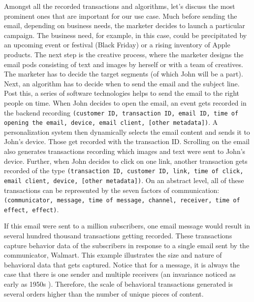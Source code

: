 Amongst all the recorded transactions and algorithms, let's discuss the most prominent ones that are important for our use case. Much before sending the email, depending on business needs, the marketer decides to launch a particular campaign. The business need, for example, in this case, could be precipitated by an upcoming event or festival (Black Friday) or a rising inventory of Apple products. The next step is the creative process, where the marketer designs the email pods consisting of text and images by herself or with a team of creatives. The marketer has to decide the target segments (of which John will be a part). Next, an algorithm has to decide when to send the email and the subject line. Post this, a series of software technologies helps to send the email to the right people on time. When John decides to open the email, an event gets recorded in the backend recording \texttt{(customer ID, transaction ID, email ID, time of opening the email, device, email client, [other metadata])}. A personalization system then dynamically selects the email content and sends it to John's device. Those get recorded with the transaction ID. Scrolling on the email also generates transactions recording which images and text were sent to John's device. Further, when John decides to click on one link, another transaction gets recorded of the type \texttt{(transaction ID, customer ID, link, time of click, email client, device, [other metadata])}. On an abstract level, all of these transactions can be represented by the seven factors of communication: \texttt{(communicator, message, time of message, channel, receiver, time of effect, effect)}. 

If this email were sent to a million subscribers, one email message would result in several hundred thousand transactions getting recorded. These transactions capture behavior data of the subscribers in response to a single email sent by the communicator, Walmart. This example illustrates the size and nature of behavioral data that gets captured. Notice that for a message, it is always the case that there is one sender and multiple receivers (an invariance noticed as early as 1950s \cite{meier1959measurement}). Therefore, the scale of behavioral transactions generated is several orders higher than the number of unique pieces of content. 


